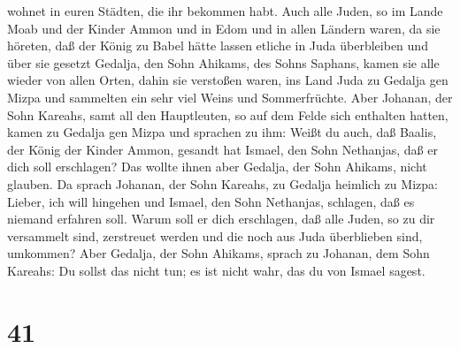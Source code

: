 wohnet in euren Städten, die ihr bekommen habt.  Auch alle
Juden, so im Lande Moab und der Kinder Ammon und in Edom und in allen
Ländern waren, da sie höreten, daß der König zu Babel hätte lassen
etliche in Juda überbleiben und über sie gesetzt Gedalja, den Sohn
Ahikams, des Sohns Saphans,  kamen sie alle wieder von
allen Orten, dahin sie verstoßen waren, ins Land Juda zu Gedalja gen
Mizpa und sammelten ein sehr viel Weins und Sommerfrüchte. 
Aber Johanan, der Sohn Kareahs, samt all den Hauptleuten, so auf dem
Felde sich enthalten hatten, kamen zu Gedalja gen Mizpa 
und sprachen zu ihm: Weißt du auch, daß Baalis, der König der Kinder
Ammon, gesandt hat Ismael, den Sohn Nethanjas, daß er dich soll
erschlagen? Das wollte ihnen aber Gedalja, der Sohn Ahikams, nicht
glauben.  Da sprach Johanan, der Sohn Kareahs, zu Gedalja
heimlich zu Mizpa: Lieber, ich will hingehen und Ismael, den Sohn
Nethanjas, schlagen, daß es niemand erfahren soll. Warum soll er dich
erschlagen, daß alle Juden, so zu dir versammelt sind, zerstreuet werden
und die noch aus Juda überblieben sind, umkommen?  Aber
Gedalja, der Sohn Ahikams, sprach zu Johanan, dem Sohn Kareahs: Du
sollst das nicht tun; es ist nicht wahr, das du von Ismael sagest.

\hypertarget{section-40}{%
\section{41}\label{section-40}}

